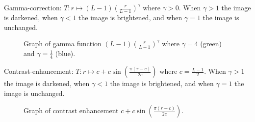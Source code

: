 \documentclass[12pt]{article}
\begin{document}
\begin{exmp}
    Gamma-correction: $T: r \mapsto (L-1)\left(\frac{r}{L-1}\right)^\gamma$ where $\gamma > 0$. When $\gamma > 1$ the image is darkened, when $\gamma < 1$ the image is brightened, and when $\gamma = 1$ the image is unchanged.
\end{exmp}

\begin{figure}[ht!]
    \centering
\caption{Graph of gamma function $(L-1)\left(\frac{r}{L-1}\right)^\gamma$ where $\gamma = 4$ (green) and $\gamma = \frac{1}{4}$ (blue).}
\label{fig:gamma}
\end{figure}

\begin{exmp}
    Contrast-enhancement: $T: r \mapsto c + c\sin\left(\frac{\pi(r-c)}{2c}\right)$ where $c = \frac{L - 1}{2}$. When $\gamma > 1$ the image is darkened, when $\gamma < 1$ the image is brightened, and when $\gamma = 1$ the image is unchanged.
\end{exmp}

\begin{figure}[ht!]
    \centering
\caption{Graph of contrast enhancement $c + c\sin\left(\frac{\pi(r-c)}{2c}\right)$.}
\label{fig:contrast}
\end{figure}
\end{document}
